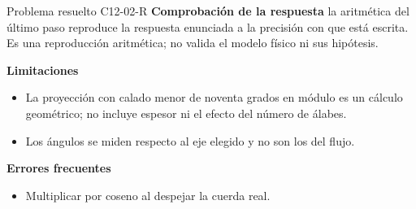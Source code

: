\documentclass[10pt,openany]{book}
\begin{document}
\begin{studiumworked}{Problema resuelto C12-02-R}
\noindent\textbf{Comprobación de la respuesta} la aritmética del último paso reproduce la respuesta enunciada a la precisión con que está escrita. Es una reproducción aritmética; no valida el modelo físico ni sus hipótesis.

\noindent\textbf{Limitaciones}
\begin{itemize}
\item La proyección con calado menor de noventa grados en módulo es un cálculo geométrico; no incluye espesor ni el efecto del número de álabes.
\item Los ángulos se miden respecto al eje elegido y no son los del flujo.
\end{itemize}

\noindent\textbf{Errores frecuentes}
\begin{itemize}
\item Multiplicar por coseno al despejar la cuerda real.
\end{itemize}
\end{studiumworked}
\end{document}
